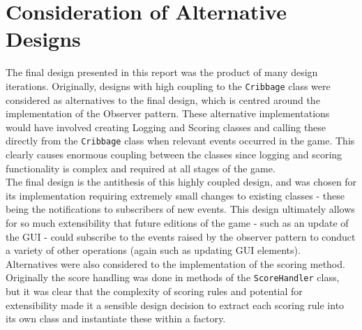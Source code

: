 \documentclass{article}
\begin{document}
\section{Consideration of Alternative Designs}
The final design presented in this report was the product of many design iterations. Originally, designs with high coupling to the \verb|Cribbage| class were considered as alternatives to the final design, which is centred around the implementation of the Observer pattern. These alternative implementations would have involved creating Logging and Scoring classes and calling these directly from the \verb|Cribbage| class when relevant events occurred in the game. This clearly causes enormous coupling between the classes since logging and scoring functionality is complex and required at all stages of the game.\\[2mm]
The final design is the antithesis of this highly coupled design, and was chosen for its implementation requiring extremely small changes to existing classes - these being the notifications to subscribers of new events. This design ultimately allows for so much extensibility that future editions of the game - such as an update of the GUI - could subscribe to the events raised by the observer pattern to conduct a variety of other operations (again such as updating GUI elements).\\[2mm]
Alternatives were also considered to the implementation of the scoring method. Originally the score handling was done in methods of the \verb|ScoreHandler| class, but it was clear that the complexity of scoring rules and potential for extensibility made it a sensible design decision to extract each scoring rule into its own class and instantiate these within a factory.


\end{document}
